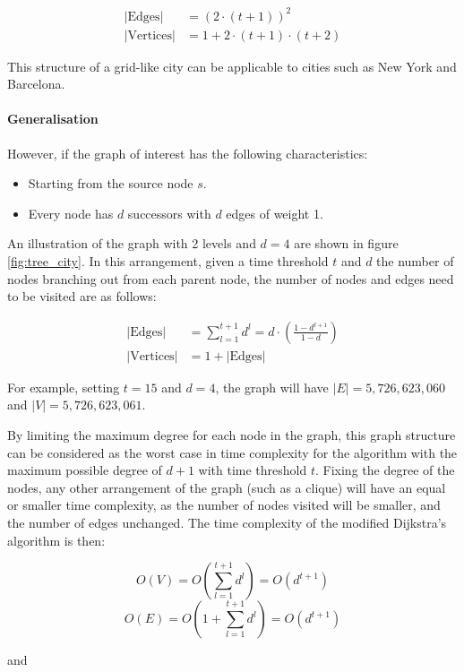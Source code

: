 $$
\begin{aligned}
    |\text{Edges}|&=(2\cdot(t+1))^2\\
    |\text{Vertices}|&=1+2\cdot(t+1)\cdot(t+2)
\end{aligned}
$$

This structure of a grid-like city can be applicable to cities such as New York and Barcelona.

\paragraph{Generalisation}

However, if the graph of interest has the following characteristics:

\begin{itemize}
    \item Starting from the source node $s$.
    \item Every node has $d$ successors with $d$ edges of weight 1.
\end{itemize}

An illustration of the graph with 2 levels and $d = 4$ are shown in figure \ref{fig:tree_city}. In this arrangement, given a time threshold $t$ and $d$ the number of nodes branching out from each parent node, the number of nodes and edges need to be visited are as follows:

$$
\begin{aligned}
    |\text{Edges}|&=\sum_{l=1}^{t+1} d^l=d\cdot\left(\frac{1-d^{t+1}}{1-d}\right)\\
    |\text{Vertices}|&=1+|\text{Edges}|
\end{aligned}
$$

For example, setting $t=15$ and $d=4$, the graph will have $|E|=5,726,623,060$ and $|V|=5,726,623,061$.

By limiting the maximum degree for each node in the graph, this graph structure can be considered as the worst case in time complexity for the algorithm with the maximum possible degree of $d+1$ with time threshold $t$. Fixing the degree of the nodes, any other arrangement of the graph (such as a clique) will have an equal or smaller time complexity, as the number of nodes visited will be smaller, and the number of edges unchanged. The time complexity of the modified Dijkstra's algorithm is then:

$$O(V)=O(\sum_{l=1}^{t+1} d^l)=O(d^{t+1})$$
$$O(E)=O(1+\sum_{l=1}^{t+1} d^l)=O(d^{t+1})$$

and

